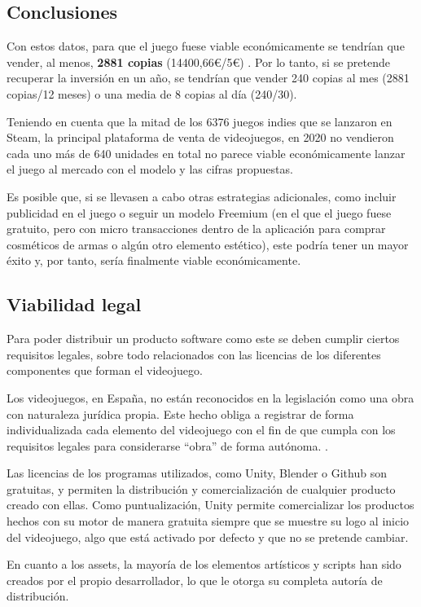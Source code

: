 \subsection{Conclusiones}
Con estos datos, para que el juego fuese viable económicamente se tendrían que vender, al menos, \textbf{2881 copias} (14400,66€/5€) . Por lo tanto, si se pretende recuperar la inversión en un año, se tendrían que vender 240 copias al mes (2881 copias/12 meses) o una media de 8 copias al día (240/30). 

Teniendo en cuenta que la mitad de los 6376 juegos indies que se lanzaron en Steam, la principal plataforma de venta de videojuegos, en 2020 no vendieron cada uno más de 640 unidades en total \cite{wiki:VentasVideojuegos} no parece viable económicamente lanzar el juego al mercado con el modelo y las cifras propuestas.

Es posible que, si se llevasen a cabo otras estrategias adicionales, como incluir publicidad en el juego o seguir un modelo Freemium (en el que el juego fuese gratuito, pero con micro transacciones dentro de la aplicación para comprar cosméticos de armas o algún otro elemento estético), este podría tener un mayor éxito y, por tanto, sería finalmente viable económicamente.

\subsection{Viabilidad legal}
Para poder distribuir un producto software como este se deben cumplir ciertos requisitos legales, sobre todo relacionados con las licencias de los diferentes componentes que forman el videojuego.

Los videojuegos, en España, no están reconocidos en la legislación como una obra con naturaleza jurídica propia. Este hecho obliga a registrar de forma individualizada cada elemento del videojuego con el fin de que cumpla con los requisitos legales para considerarse ``obra'' de forma autónoma. \cite{wiki:RequisitosLegales}.

Las licencias de los programas utilizados, como Unity, Blender o Github son gratuitas, y permiten la distribución y comercialización de cualquier producto creado con ellas. Como puntualización, Unity permite comercializar los productos hechos con su motor de manera gratuita siempre que se muestre su logo al inicio del videojuego, algo que está activado por defecto y que no se pretende cambiar.

En cuanto a los assets, la mayoría de los elementos artísticos y scripts han sido creados por el propio desarrollador, lo que le otorga su completa autoría de distribución.

